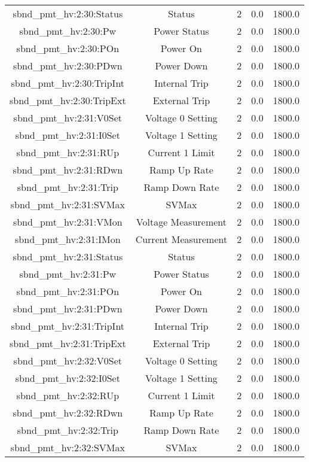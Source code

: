 \begin{center}
\begin{longtable}{c | c c c c }
sbnd\_pmt\_hv:2:30:Status & Status & 2 & 0.0 & 1800.0\\ 
sbnd\_pmt\_hv:2:30:Pw & Power Status & 2 & 0.0 & 1800.0\\ 
sbnd\_pmt\_hv:2:30:POn & Power On & 2 & 0.0 & 1800.0\\ 
sbnd\_pmt\_hv:2:30:PDwn & Power Down & 2 & 0.0 & 1800.0\\ 
sbnd\_pmt\_hv:2:30:TripInt & Internal Trip & 2 & 0.0 & 1800.0\\ 
sbnd\_pmt\_hv:2:30:TripExt & External Trip & 2 & 0.0 & 1800.0\\ 
sbnd\_pmt\_hv:2:31:V0Set & Voltage 0 Setting & 2 & 0.0 & 1800.0\\ 
sbnd\_pmt\_hv:2:31:I0Set & Voltage 1 Setting & 2 & 0.0 & 1800.0\\ 
sbnd\_pmt\_hv:2:31:RUp & Current 1 Limit & 2 & 0.0 & 1800.0\\ 
sbnd\_pmt\_hv:2:31:RDwn & Ramp Up Rate & 2 & 0.0 & 1800.0\\ 
sbnd\_pmt\_hv:2:31:Trip & Ramp Down Rate & 2 & 0.0 & 1800.0\\ 
sbnd\_pmt\_hv:2:31:SVMax & SVMax & 2 & 0.0 & 1800.0\\ 
sbnd\_pmt\_hv:2:31:VMon & Voltage Measurement & 2 & 0.0 & 1800.0\\ 
sbnd\_pmt\_hv:2:31:IMon & Current Measurement & 2 & 0.0 & 1800.0\\ 
sbnd\_pmt\_hv:2:31:Status & Status & 2 & 0.0 & 1800.0\\ 
sbnd\_pmt\_hv:2:31:Pw & Power Status & 2 & 0.0 & 1800.0\\ 
sbnd\_pmt\_hv:2:31:POn & Power On & 2 & 0.0 & 1800.0\\ 
sbnd\_pmt\_hv:2:31:PDwn & Power Down & 2 & 0.0 & 1800.0\\ 
sbnd\_pmt\_hv:2:31:TripInt & Internal Trip & 2 & 0.0 & 1800.0\\ 
sbnd\_pmt\_hv:2:31:TripExt & External Trip & 2 & 0.0 & 1800.0\\ 
sbnd\_pmt\_hv:2:32:V0Set & Voltage 0 Setting & 2 & 0.0 & 1800.0\\ 
sbnd\_pmt\_hv:2:32:I0Set & Voltage 1 Setting & 2 & 0.0 & 1800.0\\ 
sbnd\_pmt\_hv:2:32:RUp & Current 1 Limit & 2 & 0.0 & 1800.0\\ 
sbnd\_pmt\_hv:2:32:RDwn & Ramp Up Rate & 2 & 0.0 & 1800.0\\ 
sbnd\_pmt\_hv:2:32:Trip & Ramp Down Rate & 2 & 0.0 & 1800.0\\ 
sbnd\_pmt\_hv:2:32:SVMax & SVMax & 2 & 0.0 & 1800.0\\ 

\end{longtable}
\end{center}
